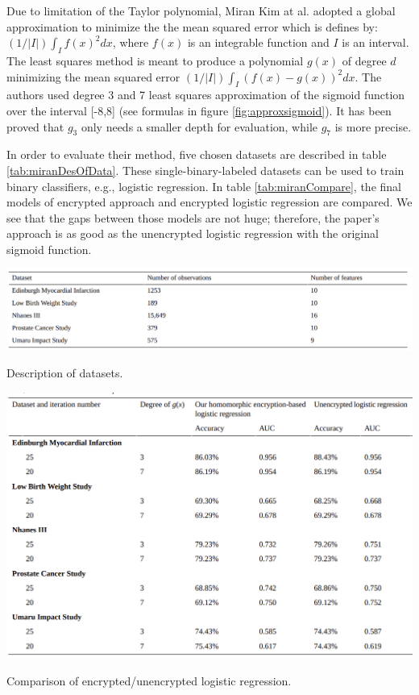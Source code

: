     Due to limitation of the Taylor polynomial, Miran Kim at al. \cite{MiranKim2018} adopted a global approximation to minimize the the mean squared error which is defines by:
    $(1 / |I|) \int_{I}f(x)^2dx$, where $f(x)$ is an integrable function and $I$ is an interval. The least squares method is meant to produce a polynomial $g(x)$ of degree $d$ minimizing the mean squared error $(1 / |I|) \int_{I}(f(x) - g(x))^2dx$. The authors used degree 3 and 7 least squares approximation of the sigmoid function over the interval [-8,8] (see formulas in figure \ref{fig:approxsigmoid}). It has been proved that $g_3$ only needs a smaller depth for evaluation, while $g_7$ is more precise.

    \begin{text}
    In order to evaluate their method, five chosen datasets are described in table \ref{tab:miranDesOfData}. These single-binary-labeled datasets can be used to train binary classifiers, e.g., logistic regression. In table \ref{tab:miranCompare}, the final models of encrypted approach and encrypted logistic regression are compared. We see that the gaps between those models are not huge; therefore, the paper's approach is as good as the unencrypted logistic regression with the original sigmoid function. 
    \end{text}
    
    \begin{table}[ht]
        \centering
        \includegraphics[width=1\linewidth]{images/Screenshot from 2021-10-03 23-53-36.png}
        \caption{Description of datasets. \cite{MiranKim2018}}
        \label{tab:miranDesOfData}
    \end{table} 
    
    \begin{table}[ht]
        \centering
        \includegraphics[width=1\linewidth]{images/Screenshot from 2021-10-04 00-12-26.png}
        \caption{Comparison of encrypted/unencrypted logistic regression. \cite{MiranKim2018}}
        \label{tab:miranCompare}
    \end{table} 
    
